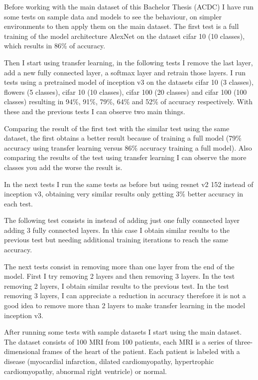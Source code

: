 \documentclass[12pt,a4paper]{article}
\begin{document}
Before working with the main dataset of this Bachelor Thesis (ACDC) I have run some tests on sample data and models to see the behaviour, on simpler environments to then apply them on the main dataset. The first test is a full training of the model architecture AlexNet on the dataset cifar 10 (10 classes), which results in 86\% of accuracy.
\bigskip

Then I start using transfer learning, in the following tests I remove the last layer, add a new fully connected layer, a softmax layer and retrain those layers. I run tests using a pretrained model of inception v3 on the datasets cifar 10 (3 classes), flowers (5 classes), cifar 10 (10 classes), cifar 100 (20 classes) and cifar 100 (100 classes) resulting in 94\%, 91\%, 79\%, 64\% and 52\% of accuracy respectively. With these and the previous tests I can observe two main things.
\bigskip

Comparing the result of the first test with the similar test using the same dataset, the first obtains a better result because of training a full model (79\% accuracy using transfer learning versus 86\% accuracy training a full model). Also comparing the results of the test using transfer learning I can observe the more classes you add the worse the result is.
\bigskip

In the next tests I run the same tests as before but using resnet v2 152 instead of inception v3, obtaining very similar results only getting 3\% better accuracy in each test.
\bigskip

The following test consists in instead of adding just one fully connected layer adding 3 fully connected layers. In this case I obtain similar results to the previous test but needing additional training iterations to reach the same accuracy.
\bigskip

The next tests consist in removing more than one layer from the end of the model. First I try removing 2 layers and then removing 3 layers. In the test removing 2 layers, I obtain similar results to the previous test. In the test removing 3 layers, I can appreciate a reduction in accuracy therefore it is not a good idea to remove more than 2 layers to make transfer learning in the model inception v3.
\bigskip

After running some tests with sample datasets I start using the main dataset. The dataset consists of 100 MRI from 100 patients, each MRI is a series of three-dimensional frames of the heart of the patient. Each patient is labeled with a disease (myocardial infarction, dilated cardiomyopathy, hypertrophic cardiomyopathy, abnormal right ventricle) or normal.
\bigskip
\end{document}
